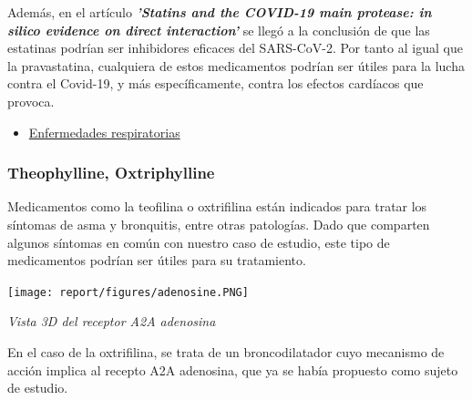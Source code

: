Además, en el artículo \textbf{\textit{'Statins and the COVID-19 main protease: in silico evidence on direct interaction' }}se llegó a la conclusión de que las estatinas podrían
ser inhibidores eficaces del SARS-CoV-2. Por tanto al igual que la pravastatina, cualquiera de estos medicamentos podrían ser útiles para la lucha contra el Covid-19, y más
específicamente, contra los efectos cardíacos que provoca.\newline

\begin{itemize}
    \item \underline{Enfermedades respiratorias}
\end{itemize}


\subsubsection{Theophylline, Oxtriphylline}

Medicamentos como la teofilina o oxtrifilina están indicados para tratar los síntomas de asma y bronquitis, entre otras patologías.
Dado que comparten algunos síntomas en común con nuestro caso de estudio, este tipo de medicamentos podrían ser útiles para su tratamiento.

\begin{center}

\texttt{[image: report/figures/adenosine.PNG]}


\caption{\textit{Vista 3D del receptor A2A adenosina}}

\end{center}

En el caso de la oxtrifilina, se trata de un broncodilatador cuyo mecanismo de acción implica al recepto A2A adenosina, que ya se había propuesto como sujeto de estudio.
\cite{Abouelkhair2020TargetingHypothesis}

